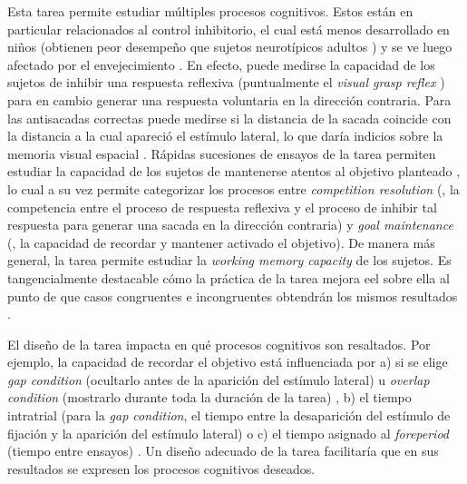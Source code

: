 Esta tarea permite estudiar múltiples procesos cognitivos.
Estos están en particular relacionados al control inhibitorio, el cual está
menos desarrollado en niños (obtienen peor desempeño que sujetos neurotípicos
adultos \cite{munoz_2004_look_away, smyrnis_2002_big_sample}) y se ve luego
afectado por el envejecimiento \cite{olincy_1997_age_diminishes_performance}.
En efecto, puede medirse la capacidad de los sujetos de inhibir una respuesta
reflexiva (puntualmente el \textit{visual grasp reflex}
\cite{munoz_2004_look_away}) para en cambio generar una respuesta voluntaria
en la dirección contraria.
Para las antisacadas correctas puede medirse si la distancia de la sacada
coincide con la distancia a la cual apareció el estímulo lateral, lo que daría
indicios sobre la memoria visual espacial
\cite{olincy_1997_age_diminishes_performance}.
Rápidas sucesiones de ensayos de la tarea permiten estudiar la capacidad
de los sujetos de mantenerse atentos al objetivo planteado
\cite{olincy_1997_age_diminishes_performance}, lo cual a su vez permite
categorizar los procesos entre \textit{competition resolution} (\ie, la
competencia entre el proceso de respuesta reflexiva y el proceso de inhibir tal
respuesta para generar una sacada en la dirección contraria) y \textit{goal
maintenance} (\ie, la capacidad de recordar y mantener activado el objetivo).
De manera más general, la tarea permite estudiar la \textit{working memory
capacity} \cite{unsworth_2011_distribution_analysis,
unsworth_2021_working_memory_capacity} de los sujetos.
Es tangencialmente destacable cómo la práctica de la tarea mejora eel
sobre ella al punto de que casos congruentes e incongruentes obtendrán los
mismos resultados \cite{unsworth_2011_distribution_analysis}.

El diseño de la tarea impacta en qué procesos cognitivos son resaltados.
Por ejemplo, la capacidad de recordar el objetivo está influenciada por a) si
se elige \textit{gap condition} (ocultarlo antes de la aparición del estímulo
lateral) u \textit{overlap condition} (mostrarlo durante toda la duración de
la tarea) \cite{munoz_2004_look_away}, b) el tiempo intratrial (para la
\textit{gap condition}, el tiempo entre la desaparición del estímulo de
fijación y la aparición del estímulo lateral) \cite{munoz_2004_look_away} o
c) el tiempo asignado al \textit{foreperiod} (tiempo entre ensayos)
\cite{unsworth_2011_distribution_analysis}.
Un diseño adecuado de la tarea facilitaría que en sus resultados se expresen
los procesos cognitivos deseados.

